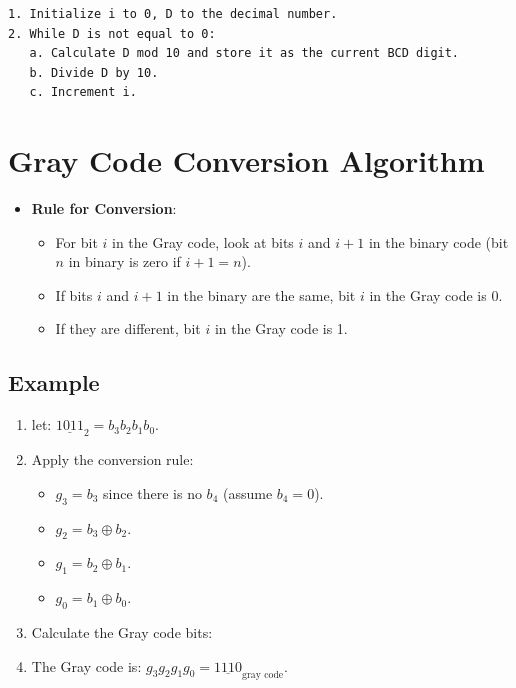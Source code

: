 \documentclass[12pt,openany, tikz,border=10pt]{book}
\begin{document}
\begin{verbatim}
1. Initialize i to 0, D to the decimal number.
2. While D is not equal to 0:
   a. Calculate D mod 10 and store it as the current BCD digit.
   b. Divide D by 10.
   c. Increment i.
\end{verbatim}

\newpage
\section{Gray Code Conversion Algorithm}
\begin{itemize}
    \item[] \textbf{Rule for Conversion}:
    \begin{itemize}
        \item[] For bit \( i \) in the Gray code, look at bits \( i \) and \( i+1 \) in the binary code (bit \( n \) in binary is zero if \( i+1 = n \)).
        \item[] If bits \( i \) and \( i+1 \) in the binary are the same, bit \( i \) in the Gray code is 0.
        \item[] If they are different, bit \( i \) in the Gray code is 1.
    \end{itemize}
\end{itemize}

\subsection{Example}

\begin{enumerate}
    \item[] let: \(\underline{1011}_{2} = b_3b_2b_1b_0 \).
    \item[] Apply the conversion rule:
    \begin{itemize}
        \item[] \( g_3 = b_3 \) since there is no \( b_4 \) (assume \( b_4 = 0 \)).
        \item[] \( g_2 = b_3 \oplus b_2 \).
        \item[] \( g_1 = b_2 \oplus b_1 \).
        \item[] \( g_0 = b_1 \oplus b_0 \).
    \end{itemize}
    \item[] Calculate the Gray code bits:
    \item[] The Gray code is: \( g_3g_2g_1g_0 = \underline{1110}_{\text{gray code}} \).
\end{enumerate}
\end{document}
